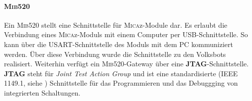 \paragraph{\textsc{Mib}520}
Ein \textsc{Mib}520 stellt eine Schnittstelle für \textsc{Mica}z-Module dar. Es erlaubt die Verbindung eines \textsc{Mica}z-Moduls mit einem Computer per USB-Schnittstelle. So kann über die USART-Schnittstelle des Moduls mit dem PC kommuniziert werden. Über diese Verbindung wurde die Schnittstelle zu den Volksbots realisiert. Weiterhin verfügt ein \textsc{Mib}520-Gateway über eine \textbf{JTAG}-Schnittstelle. \textbf{JTAG} steht für \textit{Joint Test Action Group} und ist eine standardisierte (IEEE 1149.1, siehe \cite{IEEE1149:2014:Online}) Schnittstelle für das Programmieren und das Debuggging von integrierten Schaltungen.

